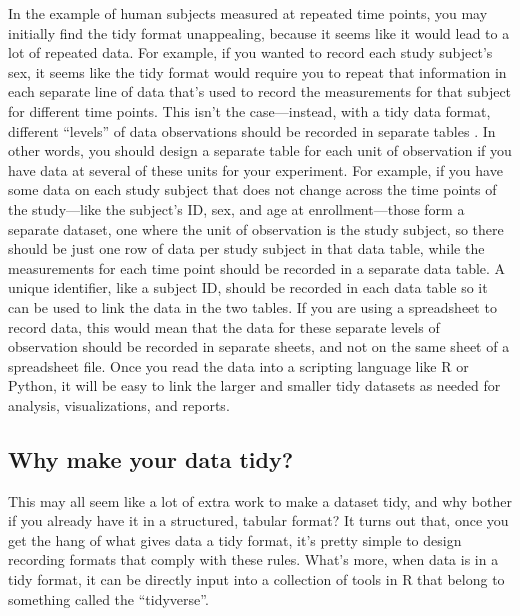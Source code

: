 \documentclass[]{tufte-book}
\begin{document}
In the example of human subjects measured at repeated time points, you may
initially find the tidy format unappealing, because it seems like it would
lead to a lot of repeated data. For example, if you wanted to record each study
subject's sex, it seems like the tidy format would require you to repeat that
information in each separate line of data that's used to record the measurements
for that subject for different time points. This isn't the case---instead, with
a tidy data format, different ``levels'' of data observations should be recorded
in separate tables \citep{wickham2014tidy}. In other words, you should design a
separate table for each unit of observation if you have data at several of these
units for your experiment. For example, if you have some data on each study
subject that does not change across the time points of the study---like the
subject's ID, sex, and age at enrollment---those form a separate dataset, one
where the unit of observation is the study subject, so there should be just one
row of data per study subject in that data table, while the measurements for
each time point should be recorded in a separate data table. A unique
identifier, like a subject ID, should be recorded in each data table so it can
be used to link the data in the two tables. If you are using a spreadsheet to
record data, this would mean that the data for these separate levels of
observation should be recorded in separate sheets, and not on the same sheet of
a spreadsheet file. Once you read the data into a scripting language like R or
Python, it will be easy to link the larger and smaller tidy datasets as needed
for analysis, visualizations, and reports.

\subsection{Why make your data tidy?}\label{why-make-your-data-tidy}

This may all seem like a lot of extra work to make a dataset tidy, and why
bother if you already have it in a structured, tabular format? It turns out
that, once you get the hang of what gives data a tidy format, it's pretty
simple to design recording formats that comply with these rules. What's more,
when data is in a tidy format, it can be directly input into a collection
of tools in R that belong to something called the ``tidyverse''.
\end{document}
